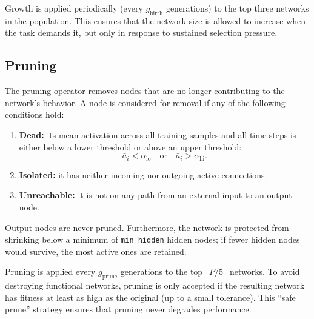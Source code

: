 Growth is applied periodically (every $g_{\text{birth}}$ generations)
to the top three networks in the population. This ensures that the
network size is allowed to increase when the task demands it, but only
in response to sustained selection pressure.

\subsection{Pruning}
\label{sec:method-prune}

The pruning operator removes nodes that are no longer contributing to
the network's behavior. A node is considered for removal if any of the
following conditions hold:

\begin{enumerate}
  \item \textbf{Dead:} its mean activation across all training samples
    and all time steps is either below a lower threshold or above an
    upper threshold:
    \begin{equation}
      \bar{a}_i < \alpha_{\text{lo}} \quad \text{or} \quad
      \bar{a}_i > \alpha_{\text{hi}}.
      \label{eq:method-dead-node}
    \end{equation}
  \item \textbf{Isolated:} it has neither incoming nor outgoing active
    connections.
  \item \textbf{Unreachable:} it is not on any path from an external
    input to an output node.
\end{enumerate}

Output nodes are never pruned. Furthermore, the network is protected
from shrinking below a minimum of \texttt{min\_hidden} hidden nodes; if
fewer hidden nodes would survive, the most active ones are retained.

Pruning is applied every $g_{\text{prune}}$ generations to the top
$\lfloor P/5 \rfloor$ networks. To avoid destroying functional networks,
pruning is only accepted if the resulting network has fitness at least
as high as the original (up to a small tolerance). This ``safe prune''
strategy ensures that pruning never degrades performance.

